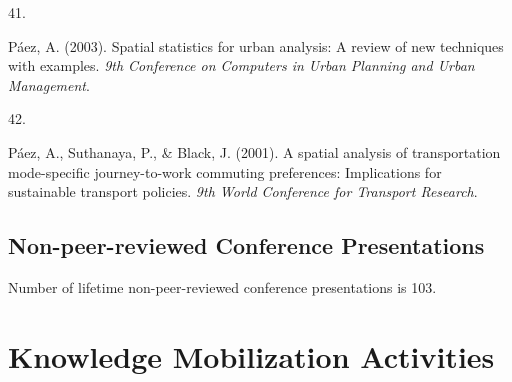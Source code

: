 \documentclass[11pt,a4paper,]{awesome-cv}
\newlength{\cslhangindent}
\newlength{\csllabelwidth}
\newenvironment{CSLReferences}[2] %
 {\begin{list}{}{%
  \setlength{\itemindent}{0pt}
  \setlength{\leftmargin}{0pt}
  \setlength{\parsep}{0pt}
  \ifodd #1
   \setlength{\leftmargin}{\cslhangindent}
   \setlength{\itemindent}{-1\cslhangindent}
  \fi
  \setlength{\itemsep}{#2\baselineskip}}}
 {\end{list}}
\newcommand{\CSLLeftMargin}[1]{\parbox[t]{\csllabelwidth}{\strut#1\strut}}
\newcommand{\CSLRightInline}[1]{\parbox[t]{\linewidth - \csllabelwidth}{\strut#1\strut}}
\begin{document}
\begin{CSLReferences}{0}{0}
\CSLLeftMargin{41. }%
\CSLRightInline{Páez, A. (2003). Spatial statistics for urban analysis:
A review of new techniques with examples. \emph{9th Conference on
Computers in Urban Planning and Urban Management}.}

\CSLLeftMargin{42. }%
\CSLRightInline{Páez, A., Suthanaya, P., \& Black, J. (2001). A spatial
analysis of transportation mode-specific journey-to-work commuting
preferences: Implications for sustainable transport policies. \emph{9th
World Conference for Transport Research}.}

\end{CSLReferences}

\subsection{Non-peer-reviewed Conference
Presentations}\label{non-peer-reviewed-conference-presentations}

Number of lifetime non-peer-reviewed conference presentations is 103.

\section{Knowledge Mobilization
Activities}\label{knowledge-mobilization-activities}
\end{document}
